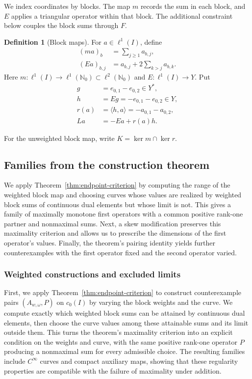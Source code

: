 \documentclass[11pt]{article}
\newcommand{\Nzero}{\mathbb N_0}
\newcommand{\pair}[2]{\langle #1,#2\rangle}
\theoremstyle{definition}
\newtheorem{definition}{Definition}
\theoremstyle{remark}
\begin{document}
We index coordinates by blocks. The map $m$ records the sum in each block, and $E$ applies a triangular operator within that block. The additional constraint below couples the block sums through $F$.
\begin{definition}[Block maps]
For $a\in\ell^1(I)$, define
\begin{equation}
\begin{aligned}
(ma)_b&=\sum_{j\ge1}a_{b,j},\\
(Ea)_{b,j}&=a_{b,j}+2\sum_{k>j}a_{b,k}.
\end{aligned}
\label{eq:D4}
\end{equation}
Here $m:\ell^1(I)\to\ell^1(\Nzero)\subset\ell^2(\Nzero)$ and $E:\ell^1(I)\to Y$. Put
\begin{equation}
\begin{aligned}
g&=e_{0,1}-e_{0,2}\in Y^*,\\
h&=Eg=-e_{0,1}-e_{0,2}\in Y,\\
r(a)&=\pair{h}{a}=-a_{0,1}-a_{0,2},\\
La&=-Ea+r(a)h.
\end{aligned}
\label{eq:D5}
\end{equation}
\end{definition}

For the unweighted block map, write $K=\ker m\cap\ker r$.

\subsection{Families from the construction theorem}
\label{subsec:counterexample-families-main}
We apply Theorem~\ref{thm:endpoint-criterion} by computing the range of the weighted block map and choosing curves whose values are realized by weighted block sums of continuous dual elements but whose limit is not. This gives a family of maximally monotone first operators with a common positive rank-one partner and nonmaximal sums. Next, a skew modification preserves this maximality criterion and allows us to prescribe the dimensions of the first operator's values. Finally, the theorem's pairing identity yields further counterexamples with the first operator fixed and the second operator varied.

\subsubsection{Weighted constructions and excluded limits}
\label{subsec:parameter-families}

First, we apply Theorem~\ref{thm:endpoint-criterion} to construct counterexample pairs $(A_{w,\omega},P)$ on $c_0(I)$ by varying the block weights and the curve. We compute exactly which weighted block sums can be attained by continuous dual elements, then choose the curve values among these attainable sums and its limit outside them. This turns the theorem's maximality criterion into an explicit condition on the weights and curve, with the same positive rank-one operator $P$ producing a nonmaximal sum for every admissible choice. The resulting families include $C^\infty$ curves and compact auxiliary maps, showing that these regularity properties are compatible with the failure of maximality under addition.
\end{document}
